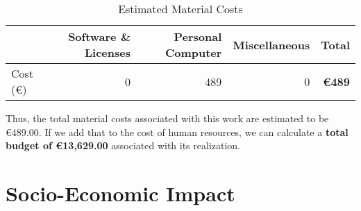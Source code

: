 \documentclass[../main.tex]{subfiles}
\begin{document}

\begin{table}[H]
    \centering
    \captionsetup[]{}
    \caption{Estimated Material Costs}
    \label{tab:budget-material_costs}
    \begin{tabular}{lrrrr}
    \toprule
    {} &  Software \& Licenses &  Personal Computer & Miscellaneous  & \textbf{Total} \\
    \midrule
    Cost (€)  &  0 & 489 &  0 & \textbf{€489} \\
    \end{tabular}
\end{table}

Thus, the total material costs associated with this work are estimated to be €489.00. If we add that to the cost of human resources, we can calculate a \textbf{total budget of €13,629.00} associated with its realization.


\section*{Socio-Economic Impact} \label{impact}



\end{document}
